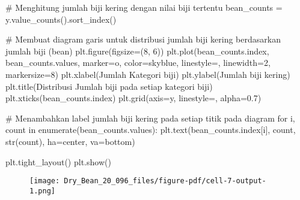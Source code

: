 \documentclass[
  letterpaper,
]{krantz}
\makeatletter
\newenvironment{Shaded}{\begin{snugshade}}{\end{snugshade}}
\newcommand{\BuiltInTok}[1]{\textcolor[rgb]{0.00,0.23,0.31}{#1}}
\newcommand{\CommentTok}[1]{\textcolor[rgb]{0.37,0.37,0.37}{#1}}
\newcommand{\ControlFlowTok}[1]{\textcolor[rgb]{0.00,0.23,0.31}{#1}}
\newcommand{\DecValTok}[1]{\textcolor[rgb]{0.68,0.00,0.00}{#1}}
\newcommand{\FloatTok}[1]{\textcolor[rgb]{0.68,0.00,0.00}{#1}}
\newcommand{\KeywordTok}[1]{\textcolor[rgb]{0.00,0.23,0.31}{#1}}
\newcommand{\NormalTok}[1]{\textcolor[rgb]{0.00,0.23,0.31}{#1}}
\newcommand{\OperatorTok}[1]{\textcolor[rgb]{0.37,0.37,0.37}{#1}}
\newcommand{\StringTok}[1]{\textcolor[rgb]{0.13,0.47,0.30}{#1}}
\newenvironment{kframe}{%
\medskip{}
\setlength{\fboxsep}{.8em}
 \def\at@end@of@kframe{}%
 \ifinner\ifhmode%
  \def\at@end@of@kframe{\end{minipage}}%
  \begin{minipage}{\columnwidth}%
 \fi\fi%
 \def\FrameCommand##1{\hskip\@totalleftmargin \hskip-\fboxsep
 \colorbox{shadecolor}{##1}\hskip-\fboxsep
     \hskip-\linewidth \hskip-\@totalleftmargin \hskip\columnwidth}%
 \MakeFramed {\advance\hsize-\width
   \@totalleftmargin\z@ \linewidth\hsize
   \@setminipage}}%
 {\par\unskip\endMakeFramed%
 \at@end@of@kframe}
\renewenvironment{Shaded}{\begin{kframe}}{\end{kframe}}
\makeatother
\begin{document}
\begin{Shaded}
\begin{Highlighting}[]
\CommentTok{\# Menghitung jumlah biji kering dengan nilai biji tertentu}
\NormalTok{bean\_counts }\OperatorTok{=}\NormalTok{ y.value\_counts().sort\_index()}

\CommentTok{\# Membuat diagram garis untuk distribusi jumlah biji kering berdasarkan jumlah biji (bean)}
\NormalTok{plt.figure(figsize}\OperatorTok{=}\NormalTok{(}\DecValTok{8}\NormalTok{, }\DecValTok{6}\NormalTok{))}
\NormalTok{plt.plot(bean\_counts.index, bean\_counts.values, marker}\OperatorTok{=}\StringTok{\textquotesingle{}o\textquotesingle{}}\NormalTok{, color}\OperatorTok{=}\StringTok{\textquotesingle{}skyblue\textquotesingle{}}\NormalTok{, linestyle}\OperatorTok{=}\StringTok{\textquotesingle{}{-}\textquotesingle{}}\NormalTok{, linewidth}\OperatorTok{=}\DecValTok{2}\NormalTok{, markersize}\OperatorTok{=}\DecValTok{8}\NormalTok{)}
\NormalTok{plt.xlabel(}\StringTok{\textquotesingle{}Jumlah Kategori biji\textquotesingle{}}\NormalTok{)}
\NormalTok{plt.ylabel(}\StringTok{\textquotesingle{}Jumlah biji kering\textquotesingle{}}\NormalTok{)}
\NormalTok{plt.title(}\StringTok{\textquotesingle{}Distribusi Jumlah biji pada setiap kategori biji\textquotesingle{}}\NormalTok{)}
\NormalTok{plt.xticks(bean\_counts.index)}
\NormalTok{plt.grid(axis}\OperatorTok{=}\StringTok{\textquotesingle{}y\textquotesingle{}}\NormalTok{, linestyle}\OperatorTok{=}\StringTok{\textquotesingle{}{-}{-}\textquotesingle{}}\NormalTok{, alpha}\OperatorTok{=}\FloatTok{0.7}\NormalTok{)}

\CommentTok{\# Menambahkan label jumlah biji kering pada setiap titik pada diagram}
\ControlFlowTok{for}\NormalTok{ i, count }\KeywordTok{in} \BuiltInTok{enumerate}\NormalTok{(bean\_counts.values):}
\NormalTok{    plt.text(bean\_counts.index[i], count, }\BuiltInTok{str}\NormalTok{(count), ha}\OperatorTok{=}\StringTok{\textquotesingle{}center\textquotesingle{}}\NormalTok{, va}\OperatorTok{=}\StringTok{\textquotesingle{}bottom\textquotesingle{}}\NormalTok{)}

\NormalTok{plt.tight\_layout()}
\NormalTok{plt.show()}
\end{Highlighting}
\end{Shaded}

\begin{figure}[H]

{\centering \texttt{[image: Dry\_Bean\_20\_096\_files/figure-pdf/cell-7-output-1.png]}

}

\end{figure}
\end{document}
